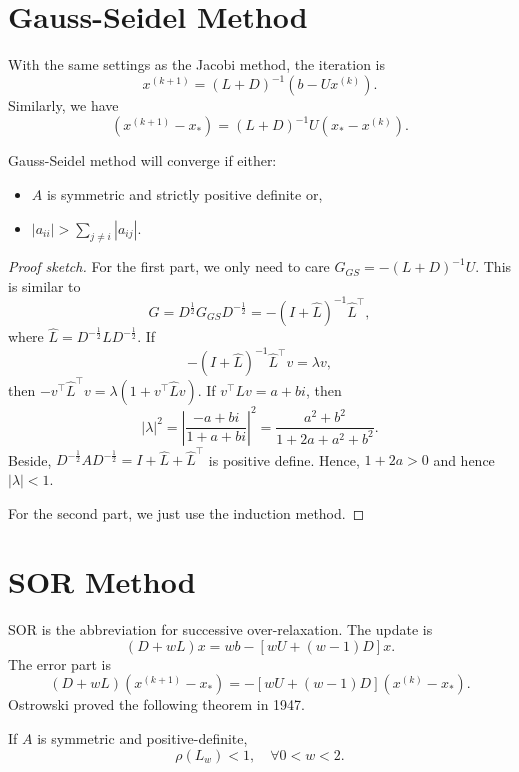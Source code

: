 \section{Gauss-Seidel Method}
With the same settings as the Jacobi method, the iteration is 
\[
    x^{(k+1)} = (L+D)^{-1} (b- U x^{(k)}). 
\] 
Similarly, we have 
\[
    (x^{(k+1)} - x_*) = (L+D)^{-1} U(x_* - x^{(k)}).  
\]

\begin{corollary}
\label{cor: Convergence of Gauss Seidel Method}
Gauss-Seidel method will converge if either: 
\begin{itemize}
    \item $A$ is symmetric and strictly positive definite or, 
    \item $ |a_{ii}| > \sum_{j\neq i} |a_{ij}|  $.
\end{itemize}

\end{corollary}
\begin{proof}[Proof sketch]
For the first part, we only need to care $ G_{GS}= -(L+D)^{-1}  U $.  This is similar to 
\[
    G = D^{\frac{1}{2}} G_{GS}D^{-\frac{1}{2}} = - (I + \hat L) ^{-1}  \hat L^\top , 
\]
where $\hat L = D^{-\frac{1}{2}}L  D^{-\frac{1}{2}} $. If 
\[
    -(I+\hat L)^{-1}  \hat L^\top  v = \lambda v, 
\]
then $ -v^\top  \hat L^\top v = \lambda (1 + v^\top   \hat L v) $. If $ v^\top Lv = a+bi $, then 
\[
    |\lambda | ^{2}  = \left| \frac{-a+bi}{1+a+bi} \right| ^{2}  = \frac{a^{2} +b^{2} }{1+2a+a^{2} +b^{2} }. 
\]
Beside, $ D^{-\frac{1}{2}}A D^{-\frac{1}{2}} = I + \hat L +\hat L^\top  $ is positive define.  Hence, $ 1+2a >0 $ and hence $ |\lambda |<1 $. 

For the second part, we just use the induction method. 
\end{proof}
\section{SOR Method} 
 SOR is the abbreviation for  successive over-relaxation. The update is 
 \[
    (D+ wL) x = wb - [wU + (w-1)D]x. 
 \]
 The error part is 
 \[
    (D+wL) (x^{(k+1)} - x_*) = - [wU + (w-1)D] (x^{(k)} - x_*). 
 \]
Ostrowski proved the following theorem in 1947. 
 
 \begin{theorem}
 \label{thm: Convergence of SOR}
 If $ A $ is symmetric and positive-definite, 
 \[
    \rho(L_w) <1 , \quad \forall 0<w<2. 
 \]
 \end{theorem}
 